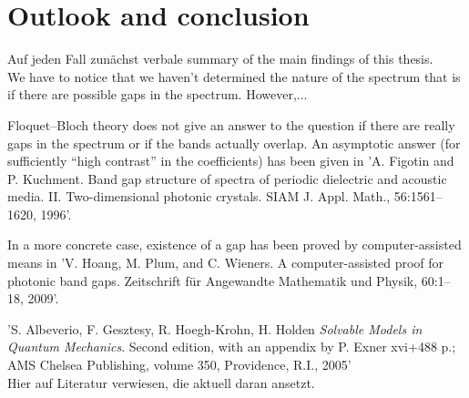 \chapter{Outlook and conclusion}	 \label{chap:8}
	
Auf jeden Fall zunächst verbale summary of the main findings of this thesis.	
~\\
	
We have to notice that we haven't determined the nature of the spectrum that is if there are possible gaps in the spectrum. However,... 

Floquet–Bloch theory does not give an answer to the question if there are really gaps in the spectrum or if the bands actually overlap. An asymptotic answer (for sufficiently “high contrast” in the coefficients) has been given in 'A. Figotin and P. Kuchment. Band gap structure of spectra of periodic dielectric and acoustic media. II. Two-dimensional photonic crystals. SIAM J. Appl. Math., 56:1561–1620, 1996'. 

In a more concrete case, existence of a gap has been proved by computer-assisted means in 'V. Hoang, M. Plum, and C. Wieners. A computer-assisted proof for photonic band gaps. 
Zeitschrift für Angewandte Mathematik und Physik, 60:1–18, 2009'.

'S. Albeverio, F. Gesztesy, R. Hoegh-Krohn, H. Holden {\it Solvable Models in Quantum Mechanics}. Second edition, with an appendix by P. Exner xvi+488 p.; AMS Chelsea Publishing, volume 350, Providence, R.I., 2005'
~\\
 
Hier auf Literatur verwiesen, die aktuell daran ansetzt.

